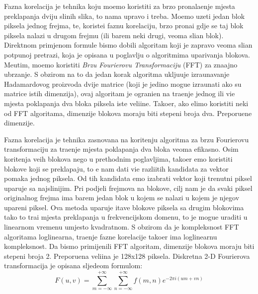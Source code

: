 Fazna korelacija je tehnika koju mo\zh emo koristiti za brzo pronala\zh enje mjesta preklapanja dviju sli\ch nih slika, \sh to nama upravo i treba. Mo\zh emo uzeti jedan blok piksela jednog frejma, te, koriste\cj i faznu korelaciju, brzo prona\cj i
gdje se taj blok piksela nalazi u drugom frejmu (ili barem neki drugi, veoma sli\ch an blok). Direktnom primjenom formule bismo dobili algoritam koji je zapravo veoma sli\ch an potpunoj pretrazi, koja je opisana u poglavlju o algoritmima
uparivanja blokova. Me\dj utim, mo\zh emo koristiti \textit{Brzu Fourierovu Transformaciju} (FFT) za zna\ch ajno ubrzanje. S obzirom na to da jedan korak algoritma uklju\ch uje izra\ch unavanje Hadamardovog proizvoda dvije matrice
(koji je jedino mogu\cj e izra\ch unati ako su matrice istih dimenzija), ovaj algoritam je ograni\ch en na tra\zh enje jednog ili vi\sh e mjesta poklapanja dva bloka piksela iste veli\ch ine. Tako\dj er, ako \zh elimo koristiti neki od FFT algoritama,
dimenzije blokova moraju biti stepeni broja dva. Preporu\ch ene dimenzije.

Fazna korelacija je tehnika zasnovana na kori\sh tenju algoritma za brzu Fourierovu transformaciju za tra\zh enje mjesta poklapanja dva bloka veoma efikasno. Osim kori\sh tenja ve\cj ih blokova nego u prethodnim poglavljima,
tako\dj er \cj emo koristiti blokove koji se preklapaju, \sh to \cj e nam dati vi\sh e razli\ch itih kandidata za vektor pomaka jednog piksela. Od tih kandidata \cj emo izabrati vektor koji trenutni piksel uparuje sa najsli\ch nijim.
Pri podjeli frejmova na blokove, cilj nam je da svaki piksel originalnog frejma ima barem jedan blok u kojem se nalazi u kojem je njegov upareni piksel.
Ova metoda uparuje \ch itave blokove piksela sa drugim blokovima tako \sh to tra\zh i mjesta preklapanja u frekvencijskom domenu, \sh to je mogu\cj e uraditi u linearnom vremenu umjesto kvadratnom. S obzirom da je kompleksnost
FFT algoritama loglinearna, tra\zh enje fazne korelacije tako\dj er ima loglinearnu kompleksnost. Da bismo primijenili FFT algoritam, dimenzije blokova moraju biti stepeni broja 2. Preporu\ch ena veli\ch ina je 128x128 piksela.
Diskretna 2-D Fourierova transformacija je opisana sljede\cj om formulom:
\[ %
F(u,v)=\sum_{m=-\infty}^{+\infty}\sum_{n=-\infty}^{+\infty}f(m,n)e^{-2\pi i(um+vn)}
\]

